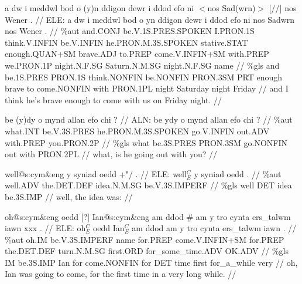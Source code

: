 \documentclass[a4paper,10pt]{article}
\begin{document}
\ex
\begingl[lingstyle=gergl]
\glchat a dw i meddwl bod o (y)n ddigon dewr i ddod efo ni $<$nos Sad(wrn)$>$ [//] nos Wener . //
\glsurface ELE:  a dw i meddwl bod o yn ddigon dewr i ddod efo ni nos Sadwrn nos Wener .  //
\glauto \%aut  and{\scriptsize .CONJ} be{\scriptsize .V.1S.PRES.SPOKEN} I{\scriptsize .PRON.1S} think{\scriptsize .V.INFIN} be{\scriptsize .V.INFIN} he{\scriptsize .PRON.M.3S.SPOKEN} stative{\scriptsize .STAT} enough{\scriptsize .QUAN+SM} brave{\scriptsize .ADJ} to{\scriptsize .PREP} come{\scriptsize .V.INFIN+SM} with{\scriptsize .PREP} we{\scriptsize .PRON.1P} night{\scriptsize .N.F.SG} Saturn{\scriptsize .N.M.SG} night{\scriptsize .N.F.SG} name   //
\glmanual \%gls  and be{\scriptsize .1S.PRES} PRON{\scriptsize .1S} think{\scriptsize .NONFIN} be{\scriptsize .NONFIN} PRON{\scriptsize .3SM} PRT enough brave to come{\scriptsize .NONFIN} with PRON{\scriptsize .1PL} night Saturday night Friday   //
\gleng and I think he's brave enough to come with us on Friday night. //
\endgl
\xe

\ex
\begingl[lingstyle=gergl]
\glchat be (y)dy o mynd allan efo chi ? //
\glsurface ALN:  be ydy o mynd allan efo chi ?  //
\glauto \%aut  what{\scriptsize .INT} be{\scriptsize .V.3S.PRES} he{\scriptsize .PRON.M.3S.SPOKEN} go{\scriptsize .V.INFIN} out{\scriptsize .ADV} with{\scriptsize .PREP} you{\scriptsize .PRON.2P}   //
\glmanual \%gls  what be{\scriptsize .3S.PRES} PRON{\scriptsize .3SM} go{\scriptsize .NONFIN} out with PRON{\scriptsize .2PL}   //
\gleng what, is he going out with you? //
\endgl
\xe

\ex
\begingl[lingstyle=gergl]
\glchat well@s:cym\&eng y syniad oedd +"/ . //
\glsurface ELE:  well$^{C}_{E}$ y syniad oedd .  //
\glauto \%aut  well{\scriptsize .ADV} the{\scriptsize .DET.DEF} idea{\scriptsize .N.M.SG} be{\scriptsize .V.3S.IMPERF}   //
\glmanual \%gls  well DET idea be{\scriptsize .3S.IMP}   //
\gleng well, the idea was: //
\endgl
\xe

\ex
\begingl[lingstyle=gergl]
\glchat oh@s:cym\&eng oedd [?] Ian@s:cym\&eng am ddod \# am y tro cynta ers\_talwm iawn xxx . //
\glsurface ELE:  oh$^{C}_{E}$ oedd Ian$^{C}_{E}$ am ddod am y tro cynta ers\_talwm iawn .  //
\glauto \%aut  oh{\scriptsize .IM} be{\scriptsize .V.3S.IMPERF} name for{\scriptsize .PREP} come{\scriptsize .V.INFIN+SM} for{\scriptsize .PREP} the{\scriptsize .DET.DEF} turn{\scriptsize .N.M.SG} first{\scriptsize .ORD} for\_some\_time{\scriptsize .ADV} OK{\scriptsize .ADV}   //
\glmanual \%gls  IM be{\scriptsize .3S.IMP} Ian for come{\scriptsize .NONFIN} for DET time first for\_a\_while very   //
\gleng oh, Ian was going to come, for the first time in a very long while. //
\endgl
\xe
\end{document}
